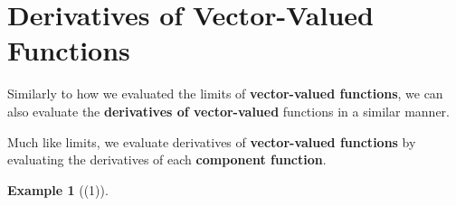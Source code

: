 \documentclass{report}
\newtheorem*{remark*}{Example}
\begin{document}
\begin{sloppypar}
\section{Derivatives of Vector-Valued Functions}
Similarly to how we evaluated the limits of
\textbf{vector-valued functions}, we can also
evaluate the \textbf{derivatives of vector-valued}
functions in a similar manner.
\par Much like limits, we evaluate derivatives
of \textbf{vector-valued functions} by
evaluating the derivatives of each
\textbf{component function}.

\begin{center}
\end{center}
\begin{remark*}[(1)]

\end{remark*}


\end{sloppypar}
\end{document}
